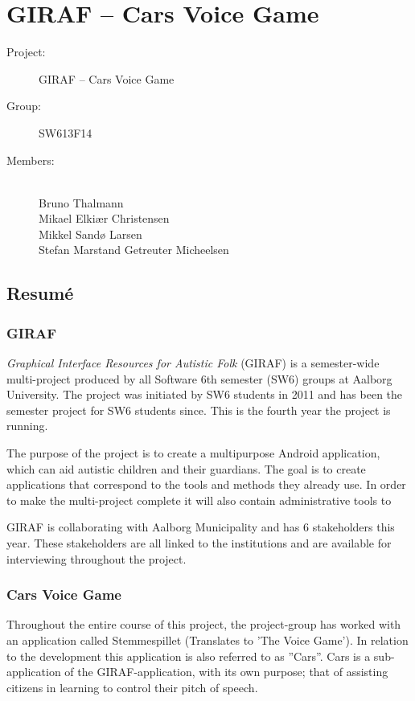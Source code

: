 \documentclass[a4paper,12pt,english]{article}
\begin{document}
\section*{GIRAF -- Cars Voice Game}

\begin{description}
\item[Project:] GIRAF -- Cars Voice Game
\item[Group:] SW613F14
\item[Members:] ~ \\
	Bruno Thalmann \\
	Mikael Elki\ae r Christensen \\
	Mikkel Sand\o{} Larsen \\
	Stefan Marstand Getreuter Micheelsen
\end{description}

\subsection*{Resum\'e}

\subsubsection*{GIRAF}
\textit{Graphical Interface Resources for Autistic Folk} (GIRAF) is a semester-wide multi-project produced by all Software 6th semester (SW6) groups at Aalborg University.
The project was initiated by SW6 students in 2011 and has been the semester project for SW6 students since.
This is the fourth year the project is running.

The purpose of the project is to create a multipurpose Android application, which can aid autistic children and their guardians.
The goal is to create applications that correspond to the tools and methods they already use.
In order to make the multi-project complete it will also contain administrative tools to 

GIRAF is collaborating with Aalborg Municipality and has 6 stakeholders this year.
These stakeholders are all linked to the institutions and are available for interviewing throughout the project.

\subsubsection*{Cars Voice Game}
Throughout the entire course of this project, the project-group has worked with an application called Stemmespillet (Translates to 'The Voice Game').
In relation to the development this application is also referred to as ''Cars''.
Cars is a sub-application of the GIRAF-application, with its own purpose; that of assisting citizens in learning to control their pitch of speech.
\end{document}
